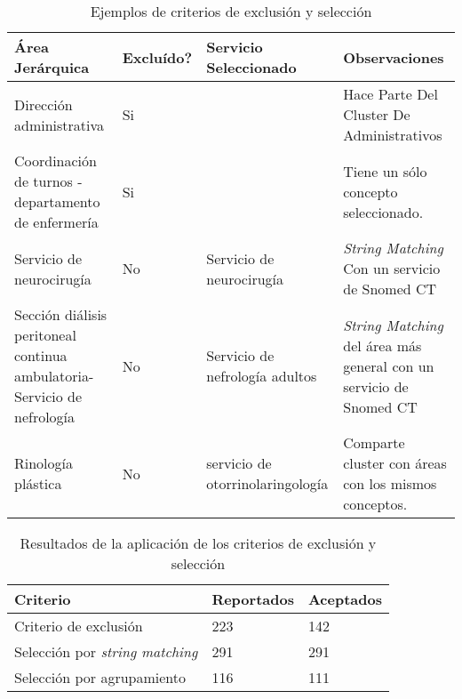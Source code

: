 \begin{table}[htb]
\centering
\caption{Ejemplos de criterios de exclusión y selección}
\label{ejemploCriterios}
\begin{tabularx}{\textwidth}{@{}XlXX@{}}
\toprule
Área Jerárquica                                                          & Excluído? & Servicio Seleccionado            & Observaciones                                                     \\ \midrule
Dirección administrativa                                                 & Si        &                                  & Hace Parte Del Cluster De Administrativos                         \\
Coordinación de turnos - departamento de enfermería                      & Si        &                                  & Tiene un sólo concepto seleccionado.                              \\
Servicio de neurocirugía                                                 & No        & Servicio de neurocirugía         & \textit{String Matching} Con un servicio de Snomed CT                      \\
Sección diálisis peritoneal continua ambulatoria- Servicio de nefrología & No        & Servicio de nefrología adultos   & \textit{String Matching} del área más general con un servicio de Snomed CT \\
Rinología plástica                                                       & No        & servicio de otorrinolaringología & Comparte cluster con áreas con los mismos conceptos.              \\ \bottomrule
\end{tabularx}
\end{table}

\begin{table}[htb]
\centering
\caption{Resultados de la aplicación de los criterios de exclusión y selección}
\label{resultadosCriterios}
\begin{tabular}{@{}lll@{}}
\toprule
Criterio                      & Reportados & Aceptados \\ \midrule
Criterio de exclusión         & 223        & 142       \\
Selección por \textit{string matching} & 291        & 291       \\
Selección por agrupamiento    & 116        & 111       \\ \bottomrule
\end{tabular}
\end{table}

